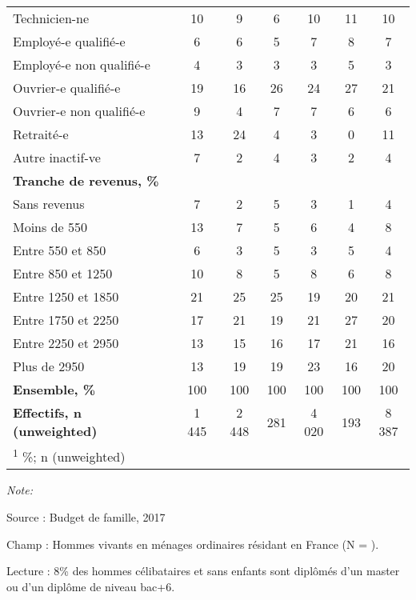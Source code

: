 \documentclass[
  12pt,
]{book}
\begin{document}
\begin{table}[!h]
{\begin{threeparttable}
\begin{tabular}[t]{lcccccc}
\hspace{1em}Technicien-ne & 10 & 9 & 6 & 10 & 11 & 10\\
\hspace{1em}Employé-e qualifié-e & 6 & 6 & 5 & 7 & 8 & 7\\
\addlinespace
\hspace{1em}Employé-e non qualifié-e & 4 & 3 & 3 & 3 & 5 & 3\\
\hspace{1em}Ouvrier-e qualifié-e & 19 & 16 & 26 & 24 & 27 & 21\\
\hspace{1em}Ouvrier-e non qualifié-e & 9 & 4 & 7 & 7 & 6 & 6\\
\hspace{1em}Retraité-e & 13 & 24 & 4 & 3 & 0 & 11\\
\hspace{1em}Autre inactif-ve & 7 & 2 & 4 & 3 & 2 & 4\\
\addlinespace
\textbf{Tranche de revenus, \%} &  &  &  &  &  & \\
\hspace{1em}Sans revenus & 7 & 2 & 5 & 3 & 1 & 4\\
\hspace{1em}Moins de 550 & 13 & 7 & 5 & 6 & 4 & 8\\
\hspace{1em}Entre 550 et 850 & 6 & 3 & 5 & 3 & 5 & 4\\
\hspace{1em}Entre 850 et 1250 & 10 & 8 & 5 & 8 & 6 & 8\\
\addlinespace
\hspace{1em}Entre 1250 et 1850 & 21 & 25 & 25 & 19 & 20 & 21\\
\hspace{1em}Entre 1750 et 2250 & 17 & 21 & 19 & 21 & 27 & 20\\
\hspace{1em}Entre 2250 et 2950 & 13 & 15 & 16 & 17 & 21 & 16\\
\hspace{1em}Plus de 2950 & 13 & 19 & 19 & 23 & 16 & 20\\
\textbf{Ensemble, \%} & 100 & 100 & 100 & 100 & 100 & 100\\
\addlinespace
\textbf{Effectifs, n (unweighted)} & 1 445 & 2 448 & 281 & 4 020 & 193 & 8 387\\
\bottomrule
\multicolumn{7}{l}{\rule{0pt}{1em}\textsuperscript{1} \%; n (unweighted)}\\
\end{tabular}
\begin{tablenotes}
\item \textit{Note: } 
\item Source : Budget de famille, 2017
\item Champ : Hommes vivants en ménages ordinaires résidant en France (N = ).
\item Lecture : 8\% des hommes célibataires et sans enfants sont diplômés d'un master ou d'un diplôme de niveau bac+6.
\end{tablenotes}
\end{threeparttable}}
\end{table}
\end{document}
